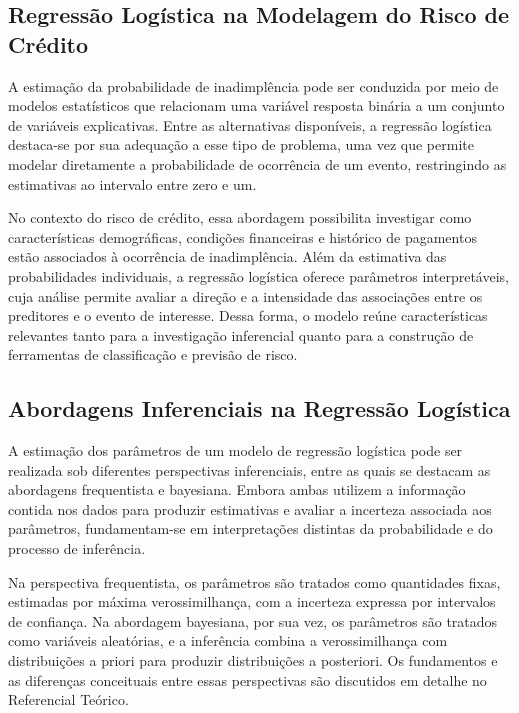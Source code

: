 \documentclass[
  brazilian,
  12pt,
  letterpaper,
  DIV=11,
  numbers=noendperiod]{scrartcl}
\begin{document}
\subsection{Regressão Logística na Modelagem do Risco de
Crédito}\label{regressuxe3o-loguxedstica-na-modelagem-do-risco-de-cruxe9dito}

A estimação da probabilidade de inadimplência pode ser conduzida por
meio de modelos estatísticos que relacionam uma variável resposta
binária a um conjunto de variáveis explicativas. Entre as alternativas
disponíveis, a regressão logística destaca-se por sua adequação a esse
tipo de problema, uma vez que permite modelar diretamente a
probabilidade de ocorrência de um evento, restringindo as estimativas ao
intervalo entre zero e um.

No contexto do risco de crédito, essa abordagem possibilita investigar
como características demográficas, condições financeiras e histórico de
pagamentos estão associados à ocorrência de inadimplência. Além da
estimativa das probabilidades individuais, a regressão logística oferece
parâmetros interpretáveis, cuja análise permite avaliar a direção e a
intensidade das associações entre os preditores e o evento de interesse.
Dessa forma, o modelo reúne características relevantes tanto para a
investigação inferencial quanto para a construção de ferramentas de
classificação e previsão de risco.

\subsection{Abordagens Inferenciais na Regressão
Logística}\label{abordagens-inferenciais-na-regressuxe3o-loguxedstica}

A estimação dos parâmetros de um modelo de regressão logística pode ser
realizada sob diferentes perspectivas inferenciais, entre as quais se
destacam as abordagens frequentista e bayesiana. Embora ambas utilizem a
informação contida nos dados para produzir estimativas e avaliar a
incerteza associada aos parâmetros, fundamentam-se em interpretações
distintas da probabilidade e do processo de inferência.

Na perspectiva frequentista, os parâmetros são tratados como quantidades
fixas, estimadas por máxima verossimilhança, com a incerteza expressa
por intervalos de confiança. Na abordagem bayesiana, por sua vez, os
parâmetros são tratados como variáveis aleatórias, e a inferência
combina a verossimilhança com distribuições a priori para produzir
distribuições a posteriori. Os fundamentos e as diferenças conceituais
entre essas perspectivas são discutidos em detalhe no Referencial
Teórico.
\end{document}
